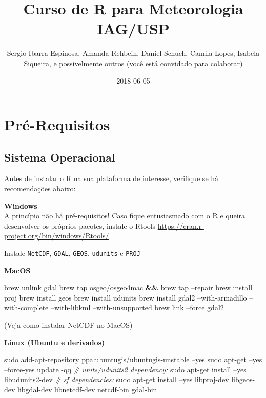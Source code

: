 \documentclass[]{book}
\title{Curso de R para Meteorologia IAG/USP}
\author{Sergio Ibarra-Espinosa, Amanda Rehbein, Daniel Schuch, Camila Lopes,
Isabela Siqueira, e possivelmente outros (você está convidado para
colaborar)}
\date{2018-06-05}
\newenvironment{Shaded}{\begin{snugshade}}{\end{snugshade}}
\newcommand{\KeywordTok}[1]{\textcolor[rgb]{0.13,0.29,0.53}{\textbf{#1}}}
\newcommand{\CommentTok}[1]{\textcolor[rgb]{0.56,0.35,0.01}{\textit{#1}}}
\newcommand{\FunctionTok}[1]{\textcolor[rgb]{0.00,0.00,0.00}{#1}}
\newcommand{\ExtensionTok}[1]{#1}
\newcommand{\NormalTok}[1]{#1}
\theoremstyle{definition}
\theoremstyle{definition}
\theoremstyle{definition}
\theoremstyle{remark}
\begin{document}
\maketitle

{
\setcounter{tocdepth}{1}
\tableofcontents
}
\chapter{Pré-Requisitos}\label{primero}

\section{Sistema Operacional}\label{sistema-operacional}

Antes de instalar o R na sua plataforma de interesse, verifique se há
recomendações abaixo:

\textbf{Windows}\\
A princípio não há pré-requisitos! Caso fique entusiasmado com o R e
queira desenvolver os próprios pacotes, instale o Rtools
\url{https://cran.r-project.org/bin/windows/Rtools/}

Instale \texttt{NetCDF}, \texttt{GDAL}, \texttt{GEOS}, \texttt{udunits}
e \texttt{PROJ}

\textbf{MacOS}

\begin{Shaded}
\begin{Highlighting}[]
\ExtensionTok{brew}\NormalTok{ unlink gdal}
\ExtensionTok{brew}\NormalTok{ tap osgeo/osgeo4mac }\KeywordTok{&&} \ExtensionTok{brew}\NormalTok{ tap --repair}
\ExtensionTok{brew}\NormalTok{ install proj}
\ExtensionTok{brew}\NormalTok{ install geos}
\ExtensionTok{brew}\NormalTok{ install udunits}
\ExtensionTok{brew}\NormalTok{ install gdal2 --with-armadillo --with-complete --with-libkml --with-unsupported}
\ExtensionTok{brew}\NormalTok{ link --force gdal2}
\end{Highlighting}
\end{Shaded}

(Veja como instalar NetCDF no MacOS)

\textbf{Linux (Ubuntu e derivados)}

\begin{Shaded}
\begin{Highlighting}[]
\FunctionTok{sudo}\NormalTok{ add-apt-repository ppa:ubuntugis/ubuntugis-unstable --yes}
\FunctionTok{sudo}\NormalTok{ apt-get --yes --force-yes update -qq}
\CommentTok{# units/udunits2 dependency:}
\FunctionTok{sudo}\NormalTok{ apt-get install --yes libudunits2-dev}
\CommentTok{# sf dependencies:}
\FunctionTok{sudo}\NormalTok{ apt-get install --yes libproj-dev libgeos-dev libgdal-dev libnetcdf-dev  netcdf-bin gdal-bin}
\end{Highlighting}
\end{Shaded}
\end{document}
